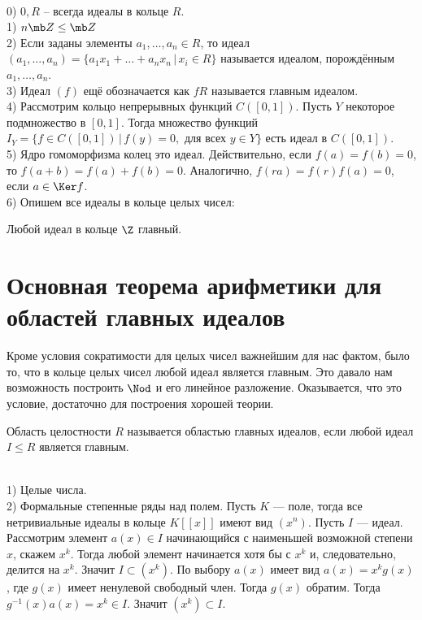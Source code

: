 \exm\\
0) $0,R$ -- всегда идеалы в кольце $R$.\\
1) $n\mb Z \leq \mb Z$\\
2) Если заданы элементы  $a_1, \dots, a_n \in R$, то идеал $(a_1,\dots,a_n)=\{a_1 x_1 + \dots +a_n x_n\, |\, x_i\in R\}$ называется идеалом, порождённым $a_1,\dots,a_n$.\\
3) Идеал $(f)$ ещё обозначается как $fR$ называется главным идеалом.\\
4) Рассмотрим кольцо непрерывных функций $C([0,1])$. Пусть $Y$ некоторое подмножество в $[0,1]$. Тогда множество функций $I_Y=\{ f\in C([0,1])\,|\, f(y)=0, \text{ для всех } y\in Y\}$ есть идеал в $C([0,1])$.\\
5) Ядро гомоморфизма колец это идеал. Действительно, если $f(a)=f(b)=0$, то $f(a+b)=f(a)+f(b)=0$. Аналогично, $f(ra)=f(r)f(a)=0$, если $a\in \Ker f$.\\
6) Опишем все идеалы в кольце целых чисел:


\utv Любой идеал в кольце $\Z$ главный.
\eutv






\section{Основная теорема арифметики для областей главных идеалов}

Кроме условия сократимости для целых чисел важнейшим для нас фактом, было то, что в кольце целых чисел любой идеал является главным. Это давало нам возможность построить $\Nod$ и его линейное разложение. Оказывается, что это условие, достаточно для построения хорошей теории.

 Область целостности $R$ называется областью главных идеалов, если любой идеал $I\leq R$ является главным.
\edfn

\exm\\
1) Целые числа.\\
2) Формальные степенные ряды над полем.
\lm Пусть $K$ --- поле, тогда все нетривиальные идеалы в кольце $K[[x]]$ имеют вид $(x^n)$. \elm
\proof
Пусть $I$ --- идеал. Рассмотрим элемент $a(x)\in I$ начинающийся с наименьшей возможной степени $x$, скажем $x^k$. Тогда любой элемент начинается хотя бы с $x^k$ и, следовательно, делится на $x^k$. Значит $I\subset (x^k)$. По выбору $a(x)$ имеет вид $a(x)=x^k g(x)$, где $g(x)$ имеет ненулевой свободный член. Тогда $g(x)$ обратим. Тогда $g^{-1}(x)a(x)=x^k\in I$. Значит $(x^k)\subset I$.
\endproof


